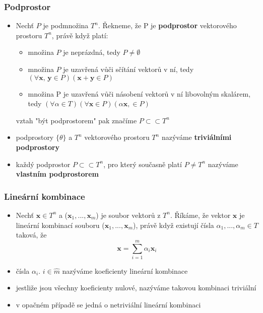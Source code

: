 \subsubsection*{Podprostor}
\begin{itemize}
	\item Nechť $P$ je podmnožina $T^n$. Řekneme, že P je \textbf{podprostor} vektorového prostoru $T^n$, právě když platí:
	\begin{itemize}
		\item množina $P$ je neprázdná, tedy $P \neq \emptyset$
		\item množina $P$ je uzavřená vůči sčítání vektorů v ní, tedy $(\forall \textbf{x, y} \in P)(\textbf{x} + \textbf{y} \in P)$
		\item množina P je uzavřená vůči násobení vektorů v ní libovolným skalárem, tedy $(\forall \alpha \in T)(\forall \textbf{x} \in P)(\alpha \textbf{x}, \in P)$
	\end{itemize}
	vztah "být podprostorem" pak značíme $P \subset\subset T^n$
	\item podprostory $\{\theta \}$ a $T^n$ vektorového prostoru $T^n$ nazýváme \textbf{triviálními podprostory}
	\item každý podprostor $P \subset \subset T^n$, pro který současně platí $P \neq T^n$ nazýváme \textbf{vlastním podprostorem}
\end{itemize}

\subsubsection*{Lineární kombinace}
\begin{itemize}
	\item Nechť $\textbf{x} \in T^n$ a ($\textbf{x}_1,...,\textbf{x}_m$) je soubor vektorů z $T^n$. Říkáme, že vektor $\textbf{x}$ je lineární kombinací souboru ($\textbf{x}_1,...,\textbf{x}_m$), právě když existují čísla $\alpha_1,...,\alpha_m \in T$ taková, že \[\textbf{x} = \sum_{i=1}^m \alpha_i\textbf{x}_i \]
	
	\item čísla $\alpha_i$. $i \in \hat{m}$ nazýváme koeficienty lineární kombinace
	\item jestliže jsou všechny koeficienty nulové, nazýváme takovou kombinaci triviální
	\item v opačném případě se jedná o netriviální lineární kombinaci
\end{itemize}

